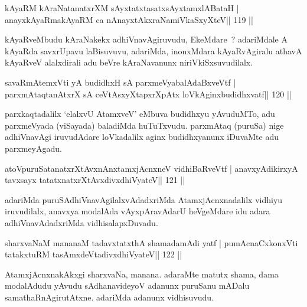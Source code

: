 \begin{shl}
kAyaRM kAraNatanatxrXM sAyxtatxtasatxsAyx\s\s tamxlABataH |
anayxkAyaRmakAyaRM ca nAnayxtAkxraNamiVkaSxyXteV\hfill || 119 ||
\end{shl}

\begin{artha}
kAyaRveMbudu kAraNakekx adhiVnavAgiruvudu, EkeMdare~? adariMdale A kAyaRda savxrUpavu laBisuvuvu, adariMda, inonxMdara kAyaRvAgiralu athavA kAyaRveV alalxdirali adu beVre kAraNavanunx niriVkiSxsuvudilalx.
\end{artha}

\begin{shl}
savaRmAtemxVti yA budidhxH sA parxmeVyabalAdaBxveVtf |
parxmAtaqtanAtxrX sA ceVtAsxyXtapxrXpAtx loVkAginxbudidhxvatf\hfill || 120 ||
\end{shl}

\begin{artha}
parxkaqtadalilx `elalxvU AtamxveV' eMbuva budidhxyu yAvuduMTo, adu parxmeVyada (viSayada) baladiMda huTuTxvudu. parxmAtaq (puruSa) nige adhiVnavAgi iruvudAdare loVkadalilx aginx budidhxyanunx iDuvaMte adu parxmeyAgadu.
\end{artha}

\begin{shl}
atoV\s puruSatanatxrXtAvxnAnx\s\s tamxjAcnxneV vidhiBaRveVtf |
anavxyAdikirxyA tavxsayx tatatxnatxrXtAvxdivxdhiVyateV\hfill || 121 ||
\end{shl}

\begin{artha}
adariMda puruSAdhiVnavAgilalxvAdadxriMda AtamxjAcnxnadalilx vidhiyu iruvudilalx, anavxya modalAda vAyxpAravAdarU heVgeMdare idu adara adhiVnavAdadxriMda vidhisalapxDuvadu.
\end{artha}


\begin{shl}
sharxvaNaM mananaM tadavxtatxthA shamadamAdi yatf |
pumAcnaCxkonxVti tatakxtuRM tasAmxdeVtadivxdhiVyateV\hfill || 122 ||
\end{shl}

\begin{artha}
AtamxjAcnxnakAkxgi sharxvaNa, manana. adaraMte matutx shama, dama modalAdudu yAvudu sAdhanavideyoV adanunx puruSanu mADalu samathaRnAgirutAtxne. adariMda adanunx vidhisuvudu.
\end{artha}


